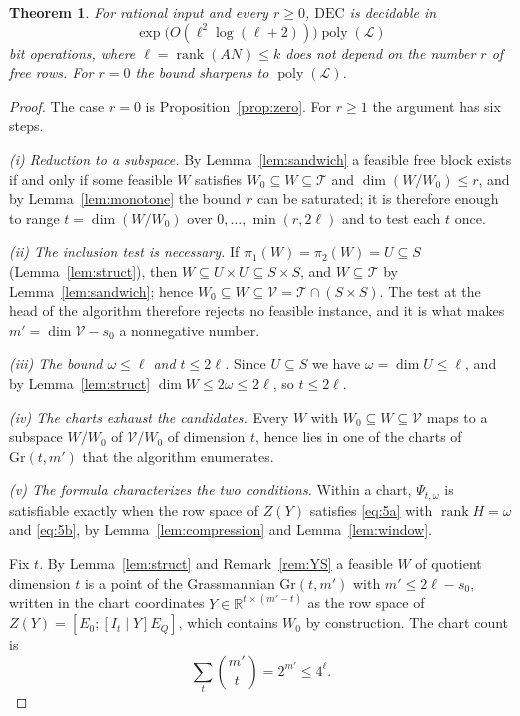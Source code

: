 \documentclass[journal]{IEEEtran}
\theoremstyle{plainn}
\newtheorem{thm}{Theorem}
\theoremstyle{remark}
\begin{document}
\begin{thm}\label{thm:fpt}
For rational input and every $r\ge0$, $\mathrm{DEC}$ is decidable in
\begin{equation}\label{eq:fpt-l}
\exp\bigl(O(\ell^2\log(\ell+2))\bigr)\operatorname{poly}(\mathcal L)
\end{equation}
bit operations, where $\ell=\operatorname{rank}(AN)\le k$ does not depend on the number $r$ of
free rows. For $r=0$ the bound sharpens to $\operatorname{poly}(\mathcal L)$.
\end{thm}

\begin{proof}
The case $r=0$ is Proposition~\ref{prop:zero}. For $r\ge1$ the argument has six steps.

\emph{(i) Reduction to a subspace.} By Lemma~\ref{lem:sandwich} a feasible free block exists if and
only if some feasible $W$ satisfies $W_0\subseteq W\subseteq\mathcal T$ and
$\dim(W/W_0)\le r$, and by Lemma~\ref{lem:monotone} the bound $r$ can be saturated; it is therefore
enough to range $t=\dim(W/W_0)$ over $0,\dots,\min(r,2\ell)$ and to test each $t$ once.

\emph{(ii) The inclusion test is necessary.} If $\pi_1(W)=\pi_2(W)=U\subseteq S$
(Lemma~\ref{lem:struct}), then $W\subseteq U\times U\subseteq S\times S$, and $W\subseteq\mathcal T$
by Lemma~\ref{lem:sandwich}; hence $W_0\subseteq W\subseteq\mathcal V=\mathcal T\cap(S\times S)$.
The test at the head of the algorithm therefore rejects no feasible instance, and it is what makes
$m'=\dim\mathcal V-s_0$ a nonnegative number.

\emph{(iii) The bound $\omega\le\ell$ and $t\le2\ell$.} Since $U\subseteq S$ we have
$\omega=\dim U\le\ell$, and by Lemma~\ref{lem:struct} $\dim W\le2\omega\le2\ell$, so
$t\le2\ell$.

\emph{(iv) The charts exhaust the candidates.} Every $W$ with
$W_0\subseteq W\subseteq\mathcal V$ maps to a subspace $W/W_0$ of $\mathcal V/W_0$ of dimension
$t$, hence lies in one of the charts of $\mathrm{Gr}(t,m')$ that the algorithm enumerates.

\emph{(v) The formula characterizes the two conditions.} Within a chart, $\Psi_{t,\omega}$ is
satisfiable exactly when the row space of $Z(Y)$ satisfies \eqref{eq:5a} with
$\operatorname{rank}H=\omega$ and \eqref{eq:5b}, by Lemma~\ref{lem:compression} and
Lemma~\ref{lem:window}.

Fix $t$. By Lemma~\ref{lem:struct} and Remark~\ref{rem:YS} a feasible $W$ of quotient dimension
$t$ is a point of the Grassmannian $\mathrm{Gr}(t,m')$ with $m'\le2\ell-s_0$, written in the chart
coordinates $Y\in\mathbb R^{t\times(m'-t)}$ as the row space of $Z(Y)=[E_0;[I_t\mid Y]E_Q]$, which
contains $W_0$ by construction. The chart count is
\begin{equation}\label{eq:charts}
\sum_{t}\binom{m'}{t}=2^{m'}\le4^{\ell}.
\end{equation}


\end{proof}
\end{document}
